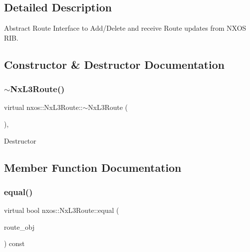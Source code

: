 \subsection{Detailed Description}
Abstract Route Interface to Add/\+Delete and receive Route updates from N\+X\+OS R\+IB. 

\subsection{Constructor \& Destructor Documentation}
\mbox{\label{classnxos_1_1_nx_l3_route_abb3762fb6629ba1900e877555cbb69dc}} 
\subsubsection{\texorpdfstring{$\sim$\+Nx\+L3\+Route()}{~NxL3Route()}}
{\footnotesize\ttfamily virtual nxos\+::\+Nx\+L3\+Route\+::$\sim$\+Nx\+L3\+Route (\begin{DoxyParamCaption}{ }\end{DoxyParamCaption})\hspace{0.3cm}{\ttfamily [inline]}, {\ttfamily [virtual]}}

Destructor 

\subsection{Member Function Documentation}
\mbox{\label{classnxos_1_1_nx_l3_route_a6dc5e111e8e8ad48aa028fc65cc483b9}} 
\subsubsection{\texorpdfstring{equal()}{equal()}}
{\footnotesize\ttfamily virtual bool nxos\+::\+Nx\+L3\+Route\+::equal (\begin{DoxyParamCaption}\item[{\mbox{\hyperlink{classnxos_1_1_nx_l3_route}{Nx\+L3\+Route}} const \&}]{route\+\_\+obj }\end{DoxyParamCaption}) const\hspace{0.3cm}{\ttfamily [pure virtual]}}


